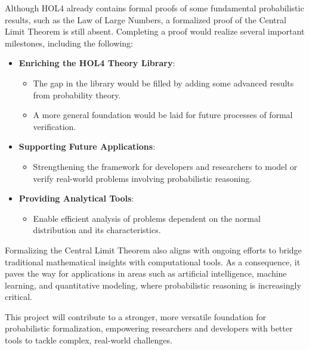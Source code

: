 Although HOL4 already contains formal proofs of some fundamental probabilistic results, such as the Law of Large Numbers, a formalized proof of the Central Limit Theorem is still absent. Completing a proof would realize several important milestones, including the following:

\begin{itemize}
    \item \textbf{Enriching the HOL4 Theory Library}:
    \begin{itemize}
        \item The gap in the library would be filled by adding some advanced results from probability theory.
        \item A more general foundation would be laid for future processes of formal verification.
    \end{itemize}
    \item \textbf{Supporting Future Applications}:
    \begin{itemize}
        \item Strengthening the framework for developers and researchers to model or verify real-world problems involving probabilistic reasoning.
    \end{itemize}
    \item \textbf{Providing Analytical Tools}:        
        \begin{itemize}
            \item Enable efficient analysis of problems dependent on the normal distribution and its characteristics.
        \end{itemize}   
\end{itemize}

Formalizing the Central Limit Theorem also aligns with ongoing efforts to bridge traditional mathematical insights with computational tools. As a consequence, it paves the way for applications in areas such as artificial intelligence, machine learning, and quantitative modeling, where probabilistic reasoning is increasingly critical.

This project will contribute to a stronger, more versatile foundation for probabilistic formalization, empowering researchers and developers with better tools to tackle complex, real-world challenges.
